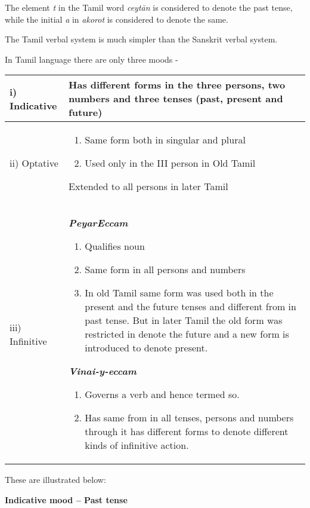 The element \textit{t} in the Tamil word \textit{ceytān} is considered to denote the past tense, while the initial \textit{a} in \textit{akorot} is considered to denote the same.

The Tamil verbal system is much simpler than the Sanskrit verbal system.

In Tamil language there are only three moods -

\begin{longtable}{|m{2.4cm}|m{6.7cm}|}
\hline
i) Indicative & Has different forms in the three persons, two numbers and three tenses (past, present and future) \\
\hline
ii) Optative & 
							
\begin{enumerate}\item Same form both in singular and plural 
								\item Used only in the III person in Old Tamil
							
\end{enumerate}
Extended to all persons  in later Tamil

						 \tabularnewline
\hline
iii) Infinitive & 
							\textbf{\textit{PeyarEccam}}

							
\begin{enumerate}\item Qualifies noun
								\item Same form in all persons and numbers
								\item In old Tamil same form was used both in the present and the future tenses and different from in past tense. But in later Tamil the old form was restricted in denote the future and a new form is introduced to denote present.
							
\end{enumerate}
\textbf{\textit{Vinai-y-eccam}}

							
\begin{enumerate}\item Governs a verb and hence termed so.
								\item Has same from in all tenses, persons and numbers through it has different forms to denote different kinds of infinitive action.
							
\end{enumerate}
 \tabularnewline
\hline
\end{longtable}

These are illustrated below:

\textbf{Indicative mood – Past tense}

